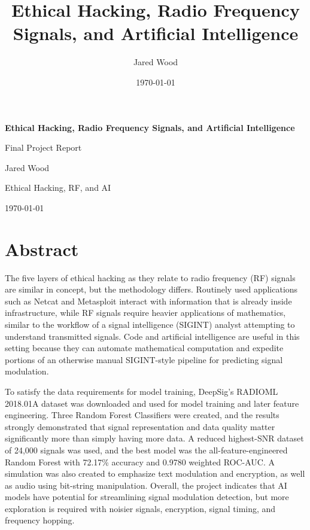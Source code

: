 \documentclass[12pt]{article}
\title{\vspace{-0.75in}\textbf{Ethical Hacking, Radio Frequency Signals, and Artificial Intelligence}}
\author{Jared Wood}
\date{\today}
\begin{document}
\begin{titlepage}
    \centering
    \vspace*{1.1in}
    {\Huge\bfseries Ethical Hacking, Radio Frequency Signals, and Artificial Intelligence\par}
    \vspace{0.3in}
    {\Large Final Project Report\par}
    \vspace{0.8in}
    {\large Jared Wood\par}
    \vspace{0.15in}
    {\large Ethical Hacking, RF, and AI\par}
    \vfill
    {\large \today\par}
\end{titlepage}

\tableofcontents
\newpage
{}

\section*{Abstract}

The five layers of ethical hacking as they relate to radio frequency (RF) signals are similar in concept, but the methodology differs. Routinely used applications such as Netcat and Metasploit interact with information that is already inside infrastructure, while RF signals require heavier applications of mathematics, similar to the workflow of a signal intelligence (SIGINT) analyst attempting to understand transmitted signals. Code and artificial intelligence are useful in this setting because they can automate mathematical computation and expedite portions of an otherwise manual SIGINT-style pipeline for predicting signal modulation.

To satisfy the data requirements for model training, DeepSig's RADIOML 2018.01A dataset was downloaded and used for model training and later feature engineering. Three Random Forest Classifiers were created, and the results strongly demonstrated that signal representation and data quality matter significantly more than simply having more data. A reduced highest-SNR dataset of 24,000 signals was used, and the best model was the all-feature-engineered Random Forest with 72.17\% accuracy and 0.9780 weighted ROC-AUC. A simulation was also created to emphasize text modulation and encryption, as well as audio using bit-string manipulation. Overall, the project indicates that AI models have potential for streamlining signal modulation detection, but more exploration is required with noisier signals, encryption, signal timing, and frequency hopping.
\end{document}
